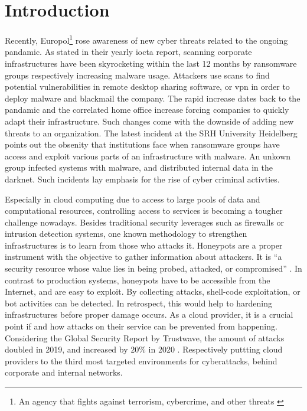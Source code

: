 \chapter{Introduction}

Recently, Europol\footnote{An agency that fights against terrorism, cybercrime, and other threats \cite{europol2021}} rose awareness of new cyber threats related to the ongoing pandamic.
As stated in their yearly \ac{iocta} report, scanning corporate infrastructures have been skyrocketing within the last 12 months by ransomware groups respectively increasing malware usage.
Attackers use scans to find potential vulnerabilities in remote desktop sharing software, or \ac{vpn} in order to deploy malware and blackmail the company. \cite{iocta2020}
The rapid increase dates back to the pandamic and the correlated home office increase forcing companies to quickly adapt their infrastructure.
Such changes come with the downside of adding new threats to an organization.
The latest incident at the SRH University Heidelberg points out the obsenity that institutions face when ransomware groups have access and exploit various parts of an infrastructure with malware.
An unkown group infected systems with malware, and distributed internal data in the darknet.
Such incidents lay emphasis for the rise of cyber criminal activties.

Especially in cloud computing due to access to large pools of data and computational resources, controlling access to services is becoming a tougher challenge nowadays.
Besides traditional security leverages such as firewalls or intrusion detection systems, one known methodology to strengthen infrastructures is to learn from those who attacks it.
Honeypots are a proper instrument with the objective to gather information about attackers.
It is \enquote{a security resource whose value lies in being probed, attacked, or compromised} \cite{Spitzner2003}.
In contrast to production systems, honeypots have to be accessible from the Internet, and are easy to exploit. 
By collecting attacks, shell-code exploitation, or bot activities can be detected.
In retrospect, this would help to hardening infrastructures before proper damage occurs.
As a cloud provider, it is a crucial point if and how attacks on their service can be prevented from happening.
Considering the Global Security Report by Trustwave, the amount of attacks doubled in 2019, and increased by $20\%$ in 2020 \cite{fahim2020}.
Respectively puttting cloud providers to the third most targeted environments for cyberattacks, behind corporate and internal networks.

